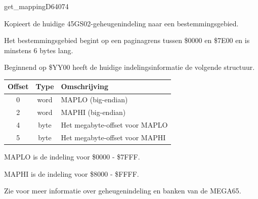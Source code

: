\newpage
\begin{hyppotrap}{get\_mapping}{D640}{74}

\item [Dienst:]  Kopieert de huidige 45GS02-geheugenindeling naar een bestemmingsgebied.
\item [Voorwaarden:]  Het bestemmingsgebied begint op een paginagrens tussen \$0000 en \$7E00 en is minstens 6 bytes lang.
\item [Invoer:]  
\item [Uitvoer:]
  \raggedright Beginnend op \$YY00 heeft de huidige indelingsinformatie de volgende structuur.  {\setlength{\tabcolsep}{2mm}
  \begin{tabular}{|c|c|p{6.9cm}|}
  \hline

  \textbf{Offset} & \textbf{Type} & \textbf{Omschrijving} \\
  \hline

  0 & word & MAPLO (big-endian) \\  2 & word & MAPHI (big-endian) \\  4 & byte & Het megabyte-offset voor MAPLO \\  5 & byte & Het megabyte-offset voor MAPHI \\
  \hline
  \end{tabular}
  }

\item [Foutcodes:]  
\item [Geschiedenis:]
\item [Opmerkingen:]  MAPLO is de indeling voor \$0000 - \$7FFF.


  MAPHI is de indeling voor \$8000 - \$FFFF.


  Zie  voor meer informatie over geheugenindeling en banken van de MEGA65.
\end{hyppotrap}


